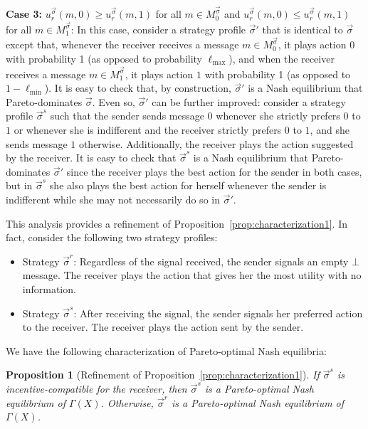 \documentclass[submission,copyright,creativecommons]{eptcs}
\newtheorem{proposition}{Proposition}
\begin{document}
\textbf{Case 3: } $u_r^{\vec{\sigma}}(m, 0) \ge u_r^{\vec{\sigma}}(m, 1)$ for all $m \in M_0^{\vec{\sigma}}$ and $u_r^{\vec{\sigma}}(m, 0) \le u_r^{\vec{\sigma}}(m, 1)$ for all $m \in M_1^{\vec{\sigma}}$: In this case, consider a strategy profile $\vec{\sigma}'$ that is identical to $\vec{\sigma}$ except that, whenever the receiver receives a message $m \in  M_0^{\vec{\sigma}}$, it plays action $0$ with probability 1 (as opposed to probability $\ell_{\max}$), and when the receiver receives a message $m \in M_1^{\vec{\sigma}}$, it plays action $1$ with probability 1 (as opposed to $1-\ell_{\min}$). It is easy to check that, by construction, $\vec{\sigma}'$ is a Nash equilibrium that Pareto-dominates $\vec{\sigma}$. Even so, $\vec{\sigma}'$ can be further improved: consider a strategy profile $\vec{\sigma}^s$ such that the sender sends message $0$ whenever she strictly prefers $0$ to $1$ or whenever she is indifferent and the receiver strictly prefers $0$ to $1$, and she sends message $1$ otherwise. Additionally, the receiver plays the action suggested by the receiver. It is easy to check that $\vec{\sigma}^s$ is a Nash equilibrium that Pareto-dominates $\vec{\sigma}'$ since the receiver plays the best action for the sender in both cases, but in $\vec{\sigma}^s$ she also plays the best action for herself whenever the sender is indifferent while she may not necessarily do so in $\vec{\sigma}'$.

This analysis provides a refinement of Proposition~\ref{prop:characterization1}. In fact, consider the following two strategy profiles:
\begin{itemize}
    \item Strategy $\vec{\sigma}^r$: Regardless of the signal received, the sender signals an empty $\bot$ message. The receiver plays the action that gives her the most utility with no information.
    \item Strategy $\vec{\sigma}^s$: After receiving the signal, the sender signals her preferred action to the receiver. The receiver plays the action sent by the sender.
\end{itemize}

We have the following characterization of Pareto-optimal Nash equilibria:

\begin{proposition}[Refinement of Proposition~\ref{prop:characterization1}]\label{prop:characterization2}
If $\vec{\sigma}^s$ is incentive-compatible for the receiver, then $\vec{\sigma}^s$ is a Pareto-optimal Nash equilibrium of $\Gamma(X)$. Otherwise, $\vec{\sigma}^r$ is a Pareto-optimal Nash equilibrium of $\Gamma(X)$.
\end{proposition}
\end{document}
